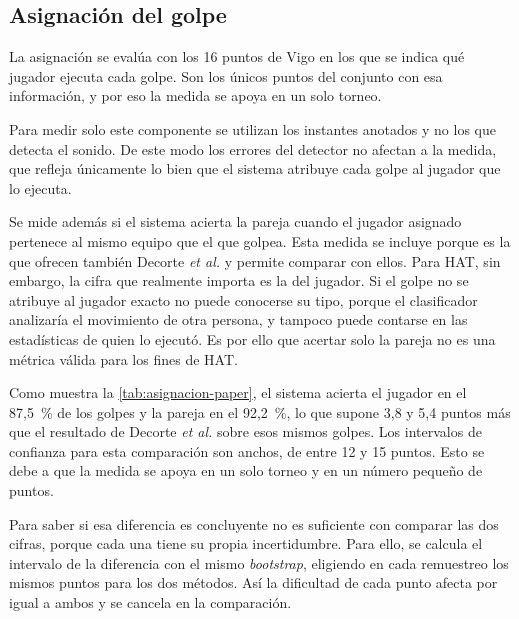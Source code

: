 \subsection{Asignación del golpe}
\label{sec:resultados-asignacion}

La asignación se evalúa con los 16 puntos de Vigo en los que se indica qué jugador ejecuta cada golpe.
Son los únicos puntos del conjunto con esa información, y por eso la medida se apoya en un solo torneo.

Para medir solo este componente se utilizan los instantes anotados y no los que detecta el sonido.
De este modo los errores del detector no afectan a la medida, que refleja únicamente lo bien que el sistema atribuye cada golpe al jugador que lo ejecuta.

Se mide además si el sistema acierta la pareja cuando el jugador asignado pertenece al mismo equipo que el que golpea.
Esta medida se incluye porque es la que ofrecen también Decorte \textit{et al.} y permite comparar con ellos.
Para HAT, sin embargo, la cifra que realmente importa es la del jugador.
Si el golpe no se atribuye al jugador exacto no puede conocerse su tipo, porque el clasificador analizaría el movimiento de otra persona, y tampoco puede contarse en las estadísticas de quien lo ejecutó.
Es por ello que acertar solo la pareja no es una métrica válida para los fines de HAT.

Como muestra la \cref{tab:asignacion-paper}, el sistema acierta el jugador en el 87,5~\% de los golpes y la pareja en el 92,2~\%, lo que supone 3,8 y 5,4 puntos más que el resultado de Decorte \textit{et al.} sobre esos mismos golpes.
Los intervalos de confianza para esta comparación son anchos, de entre 12 y 15 puntos.
Esto se debe a que la medida se apoya en un solo torneo y en un número pequeño de puntos.

\begin{table}[htbp]
  \centering
  \caption{Acierto de la asignación del golpe frente a Decorte \textit{et al.}\ en los mismos golpes.}
  \label{tab:asignacion-paper}
  
\end{table}

Para saber si esa diferencia es concluyente no es suficiente con comparar las dos cifras, porque cada una tiene su propia incertidumbre.
Para ello, se calcula el intervalo de la diferencia con el mismo \textit{bootstrap}, eligiendo en cada remuestreo los mismos puntos para los dos métodos.
Así la dificultad de cada punto afecta por igual a ambos y se cancela en la comparación.


